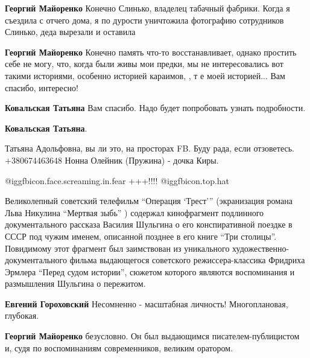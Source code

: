 \begin{itemize}
\begin{itemize}
\begin{itemize} %
\textbf{Георгий Майоренко} Конечно Слинько, владелец табачный фабрики. Когда я съездила с отчего дома, я по дурости уничтожила фотографию сотрудников Слинько, деда вырезали и оставила

\textbf{Георгий Майоренко} Конечно память что-то восстанавливает, однако простить себе не могу, что, когда были живы мои предки, мы не интересовались вот такими историями, особенно историей караимов, , т е моей историей... Вам спасибо, интересно!

\textbf{Ковальская Татьяна} Вам спасибо. Надо будет попробовать узнать подробности.
\end{itemize} %

\textbf{Ковальская Татьяна}. 

Татьяна Адольфовна, вы ли это, на просторах FB. Буду рада, если отзоветесь.
+380674463648 Нонна Олейник (Пружина) - дочка Киры.

\end{itemize} %

 @igg{fbicon.face.screaming.in.fear}  +++!!!! @igg{fbicon.top.hat} 


Великолепный советский телефильм \enquote{Операция \enquote{Трест}} (экранизация романа Льва
Никулина \enquote{Мертвая зыбь} ) содержал кинофрагмент подлинного документального
рассказа Василия Шульгина о его конспиративной поездке в СССР под чужим именем,
описанной позднее в его книге \enquote{Три столицы}. Повидимому этот фрагмент был
заимствован из уникального художественно-документального фильма выдающегося
советского режиссера-классика Фридриха Эрмлера \enquote{Перед судом истории}, сюжетом
которого являются воспоминания и размышления Шульгина о пережитом.

\begin{itemize} %
\textbf{Евгений Гороховский} Несомненно - масштабная личность! Многоплановая, глубокая.

\textbf{Георгий Майоренко} безусловно. Он был выдающимся писателем-публицистом и, судя по воспоминаниям современников, великим оратором.
\end{itemize} %

\end{itemize} %

